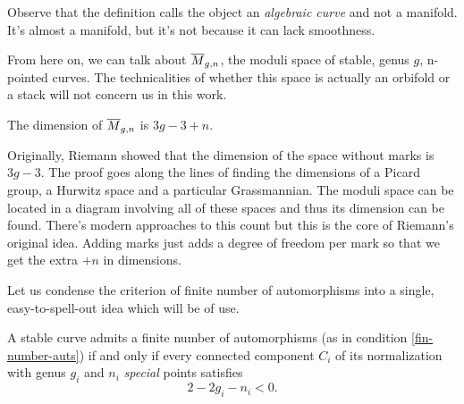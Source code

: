 \documentclass[12pt]{memoir}
\begin{document}
\begin{Rmk}
Observe that the definition calls the object an \emph{algebraic curve} and not a manifold. It's almost a manifold, but it's not because it can lack smoothness.
\end{Rmk}

From here on, we can talk about $\overline{M}_{g,n}$, the moduli space of stable, genus $g$, n-pointed curves. The technicalities of whether this space is actually an orbifold or a stack will not concern us in this work. 

\begin{Prop}\label{prop-dim-Mgn}
    The dimension of $\overline{M}_{g,n}$ is $3g-3+n$.
\end{Prop}

Originally, Riemann showed that the dimension of the space without marks is $3g-3$. The proof goes along the lines of finding the dimensions of a Picard group, a Hurwitz space and a particular Grassmannian. The moduli space can be located in a diagram involving all of these spaces and thus its dimension can be found. There's modern approaches to this count but this is the core of Riemann's original idea. Adding marks just adds a degree of freedom per mark so that we get the extra $+n$ in dimensions.\par
Let us condense the criterion of finite number of automorphisms into a single, easy-to-spell-out idea which will be of use.

\begin{Th}\label{th-stability-condition-22gn}
A stable curve admits a finite number of automorphisms (as in condition \ref{fin-number-auts}) if and only if every connected component $C_i$ of its normalization with genus $g_i$ and $n_i$ \emph{special} points satisfies 
$$2-2g_i-n_i<0.$$
\end{Th}
\end{document}

